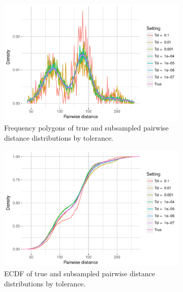 \documentclass{article}
\begin{document}
\begin{figure}
    \begin{subfigure}{.5\textwidth}
        \includegraphics[width=\linewidth]{Figures/PairwiseDistance/freqpoly_by_tol.pdf}
   		\caption{Frequency polygons of true and subsampled pairwise distance distributions by tolerance.}
    	\label{fig:FreqPoly}
    \end{subfigure}
    \begin{subfigure}{.5\textwidth}
        \includegraphics[width=\linewidth]{Figures/PairwiseDistance/ecdf_by_tol.pdf}
    	\caption{ECDF of true and subsampled pairwise distance distributions by tolerance.}
    	\label{fig:ECDF}
    \end{subfigure}
    \begin{subfigure}{.5\textwidth}

\end{subfigure}
\end{figure}
\end{document}

